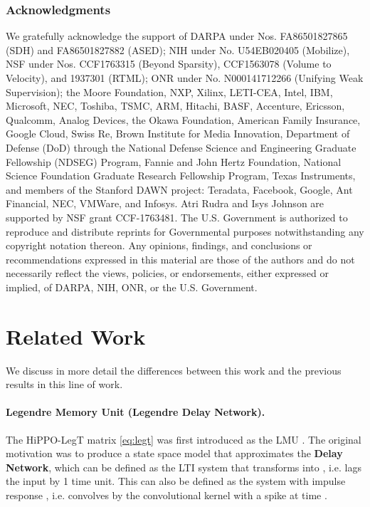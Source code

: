 \documentclass{article}
\newcommand{\para}[1]{\paragraph{#1}}
\begin{document}
\subsubsection*{Acknowledgments}
We gratefully acknowledge the support of DARPA under Nos. FA86501827865 (SDH) and FA86501827882 (ASED); NIH under No. U54EB020405 (Mobilize), NSF under Nos. CCF1763315 (Beyond Sparsity), CCF1563078 (Volume to Velocity), and 1937301 (RTML); ONR under No. N000141712266 (Unifying Weak Supervision); the Moore Foundation, NXP, Xilinx, LETI-CEA, Intel, IBM, Microsoft, NEC, Toshiba, TSMC, ARM, Hitachi, BASF, Accenture, Ericsson, Qualcomm, Analog Devices, the Okawa Foundation, American Family Insurance, Google Cloud, Swiss Re, Brown Institute for Media Innovation, Department of Defense (DoD) through the National Defense Science and Engineering Graduate Fellowship (NDSEG) Program,  Fannie and John Hertz Foundation, National Science Foundation Graduate Research Fellowship Program, Texas Instruments, and members of the Stanford DAWN project: Teradata, Facebook, Google, Ant Financial, NEC, VMWare, and Infosys.
Atri Rudra and Isys Johnson are supported by NSF grant CCF-1763481.
The U.S. Government is authorized to reproduce and distribute reprints for Governmental purposes notwithstanding any copyright notation thereon. Any opinions, findings, and conclusions or recommendations expressed in this material are those of the authors and do not necessarily reflect the views, policies, or endorsements, either expressed or implied, of DARPA, NIH, ONR, or the U.S. Government.


\newpage


\newpage

\appendix

\section{Related Work}
\label{sec:related}

We discuss in more detail the differences between this work and the previous results in this line of work.

\para{Legendre Memory Unit (Legendre Delay Network).}
The HiPPO-LegT matrix \eqref{eq:legt} was first introduced as the LMU \citep{voelker2019dynamical,voelker2019legendre}.
The original motivation was to produce a state space model that approximates the \textbf{Delay Network},
which can be defined as the LTI system that transforms  into , i.e. lags the input by 1 time unit.
This can also be defined as the system with impulse response , i.e. convolves by the convolutional kernel with a  spike at time .
\end{document}
